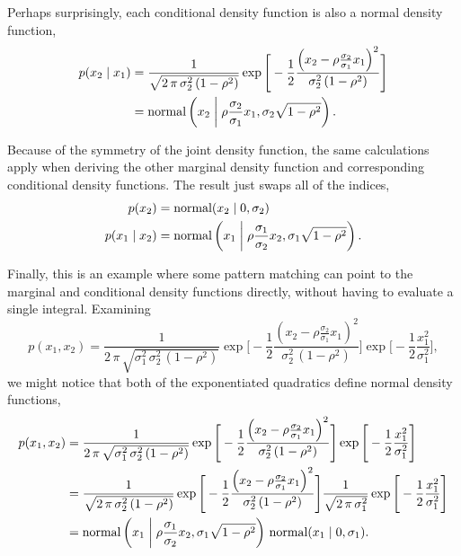 \documentclass[
  letterpaper,
  DIV=11,
  numbers=noendperiod]{scrartcl}
\begin{document}
Perhaps surprisingly, each conditional density function is also a normal
density function, \begin{align*}
p ( x_{2} \mid x_{1} )
&=
\frac{1}{
  \sqrt{ 2 \, \pi \, \sigma_{2}^{2} \, (1 - \rho^{2} ) }
}
\exp \Bigg[
  -\frac{1}{2}
      \frac{
      \left(
        x_{2} - \rho \frac{ \sigma_{2} }{ \sigma_{1} } x_{1}
      \right)^{2}
    }{
      \sigma_{2}^{2} \, (1 - \rho^{2} )
    }
\Bigg]
\\
&=
\text{normal} \left(
  x_{2} \biggm|
  \rho \frac{ \sigma_{2} }{ \sigma_{1} } x_{1},
  \sigma_{2} \sqrt{ 1 - \rho^{2} }
\right).
\end{align*}

Because of the symmetry of the joint density function, the same
calculations apply when deriving the other marginal density function and
corresponding conditional density functions. The result just swaps all
of the indices, \begin{align*}
p ( x_{2} )
&=
\text{normal} ( x_{2} \mid 0, \sigma_{2} )
\\
p ( x_{1} \mid x_{2} )
&=
\text{normal} \left(
  x_{1} \biggm|
  \rho \frac{ \sigma_{1} }{ \sigma_{2} } x_{2},
  \sigma_{1} \sqrt{ 1 - \rho^{2} }
\right).
\end{align*}

Finally, this is an example where some pattern matching can point to the
marginal and conditional density functions directly, without having to
evaluate a single integral. Examining \[
p( x_{1}, x_{2} )
=
\frac{1}{
  2 \, \pi \,
  \sqrt{ \sigma_{1}^{2} \, \sigma_{2}^{2} \, (1 - \rho^{2} ) }
}
\exp \Bigg[
  -\frac{1}{2}
      \frac{
      \left(
        x_{2} - \rho \frac{ \sigma_{2} }{ \sigma_{1} } x_{1}
      \right)^{2}
    }{
      \sigma_{2}^{2} \, (1 - \rho^{2} )
    }
\Bigg]
\exp \Bigg[
  -\frac{1}{2} \frac{  x_{1}^{2} }{ \sigma_{1}^{2} }
\Bigg],
\] we might notice that both of the exponentiated quadratics define
normal density functions, \begin{align*}
p( x_{1}, x_{2} )
&=
\frac{1}{
  2 \, \pi \,
  \sqrt{ \sigma_{1}^{2} \, \sigma_{2}^{2} \, (1 - \rho^{2} ) }
}
\exp \Bigg[
  -\frac{1}{2}
      \frac{
      \left(
        x_{2} - \rho \frac{ \sigma_{2} }{ \sigma_{1} } x_{1}
      \right)^{2}
    }{
      \sigma_{2}^{2} \, (1 - \rho^{2} )
    }
\Bigg]
\exp \Bigg[
  -\frac{1}{2} \frac{  x_{1}^{2} }{ \sigma_{1}^{2} }
\Bigg]
\\
&=
\frac{1}{
  \sqrt{ 2 \, \pi \, \sigma_{2}^{2} \, (1 - \rho^{2} ) }
}
\exp \Bigg[
  -\frac{1}{2}
      \frac{
      \left(
        x_{2} - \rho \frac{ \sigma_{2} }{ \sigma_{1} } x_{1}
      \right)^{2}
    }{
      \sigma_{2}^{2} \, (1 - \rho^{2} )
    }
\Bigg]
\frac{1}{ \sqrt{ 2 \, \pi \, \sigma_{1}^{2} } }
\exp \Bigg[
  -\frac{1}{2} \frac{  x_{1}^{2} }{ \sigma_{1}^{2} }
\Bigg]
\\
&=
\text{normal} \left(
  x_{1} \biggm|
  \rho \frac{ \sigma_{1} }{ \sigma_{2} } x_{2},
  \sigma_{1} \sqrt{ 1 - \rho^{2} }
\right) \,
\text{normal} ( x_{1} \mid 0, \sigma_{1} ).
\end{align*}
\end{document}
